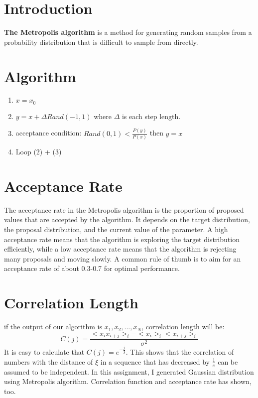 \documentclass{article}
\begin{document}
\section{Introduction}
\textbf{The Metropolis algorithm} is a method for generating random samples from a probability distribution that is difficult to sample from directly.

\section{Algorithm}
\begin{enumerate}
    \item $x=x_0$
    \item $y = x + \Delta Rand(-1,1)$ where $\Delta$ is each step length.
    \item acceptance condition: $Rand(0,1) < \frac {P(y)}{P(x)} $ then $y=x$
    \item Loop (2) + (3)
\end{enumerate}
\section{Acceptance Rate}
The acceptance rate in the Metropolis algorithm is the proportion of proposed values that are accepted by the algorithm. It depends on the target distribution, the proposal distribution, and the current value of the parameter. A high acceptance rate means that the algorithm is exploring the target distribution efficiently, while a low acceptance rate means that the algorithm is rejecting many proposals and moving slowly. A common rule of thumb is to aim for an acceptance rate of about 0.3-0.7 for optimal performance.
\section{Correlation Length}
if the output of our algorithm is ${x_1, x_2, ..., x_N}$, correlation length will be:
\begin{equation}
C(j) = \frac{<x_ix_{i+j}>_i -<x_i>_i<x_{i+j}>_i}{\sigma ^ 2}
\end{equation}
It is easy to calculate that $C(j)=e^{-\frac{j}{\xi}}$. This shows that the correlation of numbers with the distance of $\xi$ in a sequence that has decreased by $\frac{1}{e}$ can be assumed to be independent.\newline
In this assignment, I generated Gaussian distribution using Metropolis algorithm. Correlation function and acceptance rate has shown, too.
\end{document}
